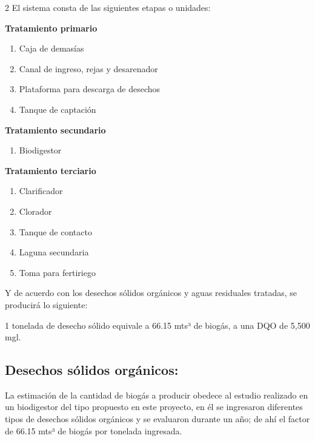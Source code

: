 \documentclass[11pt,spanish,Letterpaper,openany]{book}
\providecommand{\tightlist}{%
  \setlength{\itemsep}{0pt}\setlength{\parskip}{0pt}}
\begin{document}
\begin {multicols}{2}
El sistema consta de las siguientes etapas o unidades:

\textbf{Tratamiento primario}

\begin{enumerate}
\def\labelenumi{\alph{enumi}.}
\item
  Caja de demasías
\item
  Canal de ingreso, rejas y desarenador
\item
  Plataforma para descarga de desechos
\item
  Tanque de captación
\end{enumerate}

\textbf{Tratamiento secundario}

\begin{enumerate}
\def\labelenumi{\alph{enumi}.}
\setcounter{enumi}{4}
\tightlist
\item
  Biodigestor
\end{enumerate}

\textbf{Tratamiento terciario}

\begin{enumerate}
\def\labelenumi{\alph{enumi}.}
\setcounter{enumi}{5}
\item
  Clarificador
\item
  Clorador
\item
  Tanque de contacto
\item
  Laguna secundaria
\item
  Toma para fertiriego
\end{enumerate}

Y de acuerdo con los desechos sólidos orgánicos y aguas residuales tratadas, se producirá lo siguiente:

1 tonelada de desecho sólido equivale a 66.15 mts³ de biogás, a una DQO de 5,500 mgl.

\hypertarget{desechos-solidos-organicos}{%
\subsection{Desechos sólidos orgánicos:}\label{desechos-solidos-organicos}}

La estimación de la cantidad de biogás a producir obedece al estudio realizado en un biodigestor del tipo propuesto en este proyecto, en él se ingresaron diferentes tipos de desechos sólidos orgánicos y se evaluaron durante un año; de ahí el factor de 66.15 mts³ de biogás por tonelada ingresada.

\begin {flushleft}
\noindent\begin{minipage}[c]{\columnwidth}


\end{minipage}
\end{flushleft}
\end{multicols}
\end{document}
